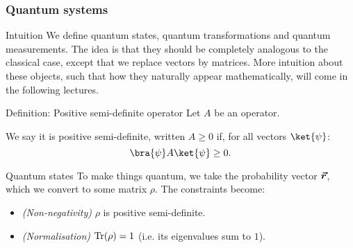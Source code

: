\documentclass[a4paper]{article}
\begin{document}
\subsubsection{Quantum systems}

\begin{parag}{Intuition}
    We define quantum states, quantum transformations and quantum measurements. The idea is that they should be completely analogous to the classical case, except that we replace vectors by matrices. More intuition about these objects, such that how they naturally appear mathematically, will come in the following lectures.
\end{parag}

\begin{parag}{Definition: Positive semi-definite operator}
    Let $A$ be an operator.

    We say it is positive semi-definite, written $A \geq 0$ if, for all vectors $\ket{\psi}$: 
    \[\bra{\psi} A \ket{\psi} \geq 0.\]
\end{parag}

\begin{parag}{Quantum states}
    To make things quantum, we take the probability vector $\bm{\protect\vec{r}}$, which we convert to some matrix $\rho$. The constraints become:
    \begin{itemize}
        \item \textit{(Non-negativity)} $\rho$ is positive semi-definite.
        \item \textit{(Normalisation)} $\Tr\left(\rho\right) = 1$ (i.e. its eigenvalues sum to $1$). 
    \end{itemize}
\end{parag}
\end{document}
